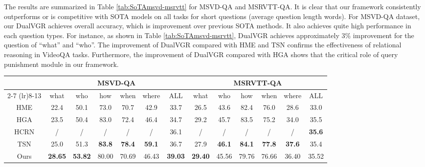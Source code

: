 \documentclass[journal]{IEEEtran}
\begin{document}
The results are summarized in Table \ref{tab:SoTAmsvd-msrvtt} for MSVD-QA and MSRVTT-QA. It is clear that our framework consistently outperforms or is competitive with SOTA models on all tasks for short questions (average question length  words). For MSVD-QA dataset, our DualVGR achieves  overall accuracy, which is  improvement over previous SOTA methods. It also achieves quite high performance in each question types. For instance, as shown in Table \ref{tab:SoTAmsvd-msrvtt}, DualVGR achieves approximately 3\% improvement for the question of ``what'' and ``who''. The improvement of DualVGR compared with HME and TSN confirms the effectiveness of relational reasoning in VideoQA tasks. Furthermore, the improvement of DualVGR compared with HGA shows that the critical role of query punishment module in our framework.
\begin{table*}[t]
    \centering
    \caption{Performance comparison to the state-of-the-art methods on MSVD-QA and MSRVTT-QA.}
    \begin{tabular}{ccccccccccccc}
    \hline
        \multirow{2}{*}{\qquad} & \multicolumn{6}{c}{MSVD-QA} & \multicolumn{6}{c}{MSRVTT-QA} \\\cmidrule(lr){2-7} \cmidrule(lr){8-13}
        &what&who&how&when&where&ALL&what&who&how&when&where&ALL\\\hline
        HME \cite{fan2019heterogeneous}&22.4&50.1&73.0&70.7&42.9&33.7&26.5&43.6&82.4&76.0&28.6&33.0 \\
        HGA \cite{jiang2020reasoning}&23.5&50.4&83.0&72.4&46.4&34.7&29.2&45.7&83.5&75.2&34.0&35.5 \\
        HCRN \cite{le2020hierarchical}&/&/&/&/&/&36.1&/&/&/&/&/&\textbf{35.6}\\
        TSN \cite{yang2019question}&25.0&51.3&\textbf{83.8}&\textbf{78.4}&\textbf{59.1}&36.7&27.9&\textbf{46.1}&\textbf{84.1}&\textbf{77.8}&\textbf{37.6}&35.4\\\hline
        Ours&\textbf{28.65}&\textbf{53.82}&80.00&70.69&46.43&\textbf{39.03}&\textbf{29.40}&45.56&79.76&76.66&36.40&35.52\\\hline
    \end{tabular}
    \label{tab:SoTAmsvd-msrvtt}
\end{table*}
\end{document}
